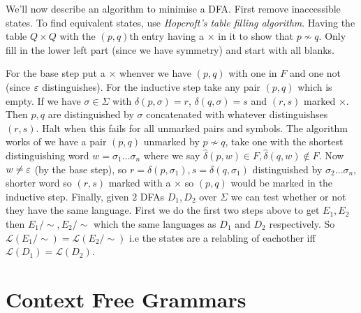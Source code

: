 \documentclass[tikx, border = 10pt]{article}
\begin{document}
\par
We'll now describe an algorithm to minimise a DFA. First remove inaccessible states. To find equivalent states, use \textit{Hopcroft's table filling algorithm}. Having the table $ Q\times Q $ with the $ (p,q) $th entry having a $ \times $ in it to show that $ p\not\sim q $. Only fill in the lower left part (since we have symmetry) and start with all blanks.
\par
For the base step put a $ \times $ whenver we have $ (p,q) $ with one in $ F $ and one not (since $ \varepsilon $ distinguishes). For the inductive step take any pair $ (p,q) $ which is empty. If we have $ \sigma\in \Sigma $ with $ \delta(p,\sigma) = r $, $ \delta(q,\sigma) = s $ and $ (r,s) $ marked $ \times $. Then $ p,q $ are distinguished by $ \sigma $ concatenated with whatever distinguishses $ (r,s) $. Halt when this fails for all unmarked pairs and symbols. The algorithm works of we have a pair $ (p,q) $ unmarked by $ p\not\sim q $, take one with the shortest distinguishing word $ w= \sigma_1\dots\sigma_n $ where we say $ \hat\delta(p,w)\in F, \hat\delta(q,w)\notin F $. Now $ w\ne \varepsilon $ (by the base step), so $ r=\delta(p,\sigma_1), s=\delta(q,\sigma_1) $ distinguished by $ \sigma_2\dots \sigma_n $, shorter word so $ (r,s) $ marked with a $ \times $ so $ (p,q) $ would be marked in the inductive step. Finally, given $ 2 $ DFAs $ D_1,D_2 $ over $ \Sigma $ we can test whether or not they have the same language. First we do the first two steps above to get $ E_1,E_2 $ then $ E_1/\sim, E_2/\sim $ which the same languages as $ D_1 $ and $ D_2 $ respectively. So $ \mathcal L(E_1/\sim) = \mathcal L(E_2/\sim) $ i.e the states are a relabling of eachother iff $ \mathcal L(D_1) = \mathcal L(D_2) $. 
\section{Context Free Grammars}
\end{document}

